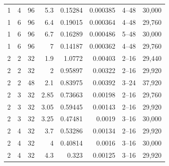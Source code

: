 \begin{longtable}{rrrrrrrl}
1 & 4 & 96 & 5.3 & 0.15284 & 0.000385 & 4--48 & 30,000\\
1 & 6 & 96 & 6.4 & 0.19015 & 0.000364 & 4--48 & 29,760\\
1 & 6 & 96 & 6.7 & 0.16289 & 0.000486 & 5--48 & 30,000\\
1 & 6 & 96 & 7 & 0.14187 & 0.000362 & 4--48 & 29,760\\
2 & 2 & 32 & 1.9 & 1.0772 & 0.00403 & 2--16 & 29,440\\
2 & 2 & 32 & 2 & 0.95897 & 0.00322 & 2--16 & 29,920\\
2 & 2 & 48 & 2.1 & 0.83975 & 0.00392 & 3--24 & 37,920\\
2 & 3 & 32 & 2.85 & 0.73663 & 0.00198 & 2--16 & 29,760\\
2 & 3 & 32 & 3.05 & 0.59445 & 0.00143 & 2--16 & 29,920\\
2 & 3 & 32 & 3.25 & 0.47481 & 0.0019 & 3--16 & 30,000\\
2 & 4 & 32 & 3.7 & 0.53286 & 0.00134 & 2--16 & 29,920\\
2 & 4 & 32 & 4 & 0.40814 & 0.0016 & 3--16 & 30,000\\
2 & 4 & 32 & 4.3 & 0.323 & 0.00125 & 3--16 & 29,920\\
\bottomrule
\end{longtable}
